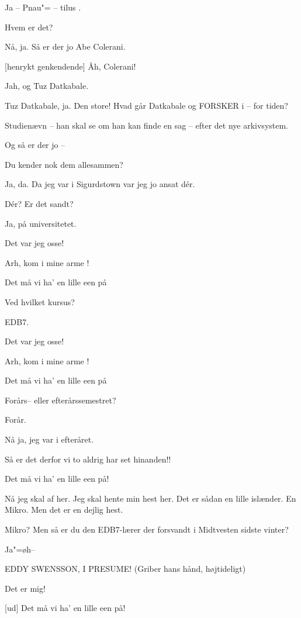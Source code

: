 \documentclass[a4paper,11pt]{article}
\begin{document}
\begin{sketch}
 Ja -- Pnau"=  -- tilus .

 Hvem er det?

 Nå, ja.  Så er der jo Abe Colerani.

[henrykt genkendende] Åh, Colerani!

 Jah, og Tuz Datkabale.

 Tuz Datkabale, ja.  Den store!   Hvad går
Datkabale og FORSKER i -- for tiden?

 Studienævn -- han skal se om han kan finde en sag -- efter det nye arkivsystem.

 Og så er der jo --

 Du kender nok dem allesammen?

 Ja, da.  Da jeg var i Sigurdstown var jeg jo ansat dér.

 Dér?  Er det sandt?

 Ja, på universitetet.

 Det var jeg osse!

 Arh, kom i mine arme !

 Det må vi ha' en lille een på 

 Ved hvilket kursus?

 EDB7.

 Det var jeg osse!

 Arh, kom i mine arme !

 Det må vi ha' en lille een på 

 Forårs-- eller efterårssemestret?

 Forår.

 Nå ja, jeg var i efteråret. 

 Så er det derfor vi to aldrig har set hinanden!!

 Det må vi ha' en lille een på!


 Nå jeg skal af her.  Jeg skal hente min hest her.  Det er
sådan en lille islænder.  En Mikro.  Men det er en dejlig hest.

 Mikro?  Men så er du den EDB7-lærer der forsvandt i Midtvesten sidste vinter?

 Ja"=øh--

 EDDY SWENSSON, I PRESUME!  (Griber hans hånd, højtideligt)

 Det er mig!

[ud] Det må vi ha' en lille een på!


\end{sketch}
\end{document}
